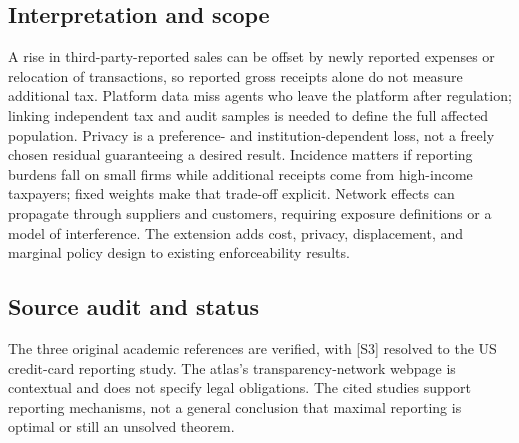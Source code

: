\documentclass[11pt,a4paper]{article}
\begin{document}
\subsection*{Interpretation and scope}
A rise in third-party-reported sales can be offset by newly reported expenses or relocation of transactions, so reported gross receipts alone do not measure additional tax. Platform data miss agents who leave the platform after regulation; linking independent tax and audit samples is needed to define the full affected population. Privacy is a preference- and institution-dependent loss, not a freely chosen residual guaranteeing a desired result. Incidence matters if reporting burdens fall on small firms while additional receipts come from high-income taxpayers; fixed weights make that trade-off explicit. Network effects can propagate through suppliers and customers, requiring exposure definitions or a model of interference. The extension adds cost, privacy, displacement, and marginal policy design to existing enforceability results.

\subsection*{Source audit and status}
The three original academic references are verified, with [S3] resolved to the US credit-card reporting study. The atlas's transparency-network webpage is contextual and does not specify legal obligations. The cited studies support reporting mechanisms, not a general conclusion that maximal reporting is optimal or still an unsolved theorem.
\end{document}
